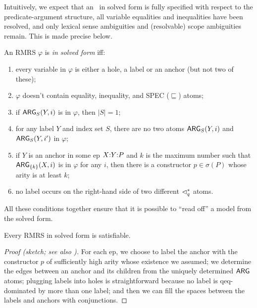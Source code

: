 Intuitively, we expect that an \rmrs\ in solved form is fully
specified with respect to the predicate-argument
structure, all variable equalities and inequalities have been
resolved, and only lexical sense ambiguities and (resolvable)
scope ambiguities remain.  This is made
precise below.


\begin{definition}\label{defn:solved-forms}
  An RMRS $\varphi$ is \emph{in solved form} iff:
  \begin{enumerate}
  \item every variable in $\varphi$ is either a hole, a label or an
    anchor (but not two of these);
  \item $\varphi$ doesn't contain equality, inequality, and SPEC
    ($\sqsubseteq$) atoms;
  \item if $\mathsf{ARG}_S(Y,i)$ is in $\varphi$, then $|S| = 1$;
  \item for any label $Y$ and index set $S$, there
    are no two atoms $\mathsf{ARG}_S(Y,i)$ and $\mathsf{ARG}_S(Y,i')$ in $\varphi$;
  \item if $Y$ is an anchor in some {\sc ep} $X {:} Y {:} P$ and $k$ is the
    maximum number such that $\mathsf{ARG}_{\{k\}}(X,i)$ is in $\varphi$ for
    any $i$, then there is a constructor $p \in \sigma(P)$ whose arity
    is at least $k$;
  \item no label occurs on the right-hand side of two
    different $\lhd^*_q$ atoms.
  \end{enumerate}
\end{definition}


All these conditions together ensure that it is possible to ``read
off'' a model from the solved form.


\begin{prop} \label{prop:solved-forms-are-satisfiable}
  Every RMRS in solved form is satisfiable.
\end{prop}
\begin{proof}[Proof (sketch; see also
  \cite{Duchier00dominanceconstraints})] 
  For each {\sc ep}, we choose to label the anchor with the constructor $p$
  of sufficiently high arity whose existence we assumed; we determine
  the edges between an anchor and its children from the uniquely
  determined $\mathsf{ARG}$ atoms; plugging labels into holes is
  straightforward because no label is qeq-dominated by more than one
  label; and then we can fill the spaces between the labels and
  anchors with conjunctions.
\end{proof}



